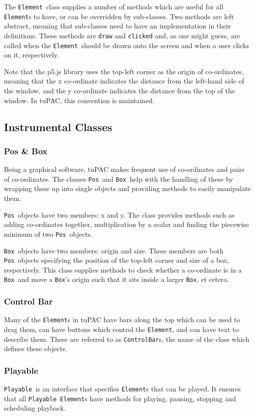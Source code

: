 \documentclass[12pt,a4paper,twoside,openright]{report}
\newcommand{\element}{\texttt{Element}}
\newcommand{\pos}{\texttt{Pos}}
\newcommand{\boxT}{\texttt{Box}}
\newcommand{\controlbar}{\texttt{ControlBar}}
\newcommand{\playable}{\texttt{Playable}}
\begin{document}
The \element\ class supplies a number of methods which are useful for all \element s to have, or can be overridden by sub-classes. Two methods are left abstract, meaning that sub-classes need to have an implementation in their definitions. These methods are \verb|draw| and \verb|clicked| and, as one might guess, are called when the \element\ should be drawn onto the screen and when a user clicks on it, respectively.

Note that the p5.js library uses the top-left corner as the origin of co-ordinates, meaning that the x co-ordinate indicates the distance from the left-hand side of the window, and the y co-ordinate indicates the distance from the top of the window. In tuPAC, this convention is maintained.

\subsection{Instrumental Classes}
\subsubsection{Pos \& Box}\label{sec:pos}
Being a graphical software, tuPAC makes frequent use of co-ordinates and pairs of co-ordinates. The classes \pos\ and \boxT\ help with the handling of these by wrapping these up into single objects and providing methods to easily manipulate them.

\pos\ objects have two members: x and y. The class provides methods such as adding co-ordinates together, multiplication by a scalar and finding the piecewise minimum of two \pos\ objects.

\boxT\ objects have two members: origin and size. These members are both \pos\ objects specifying the position of the top-left corner and size of a box, respectively. This class supplies methods to check whether a co-ordinate is in a \boxT\ and move a \boxT's origin such that it sits inside a larger \boxT, et cetera.

\subsubsection{Control Bar}
Many of the \element s in tuPAC have bars along the top which can be used to drag them, can have buttons which control the \element, and can have text to describe them. These are referred to as \controlbar s, the name of the class which defines these objects.

\subsubsection{Playable}
\playable\ is an interface that specifies \element s that can be played. It ensures that all \playable\ \element s have methods for playing, pausing, stopping and scheduling playback.
\end{document}
